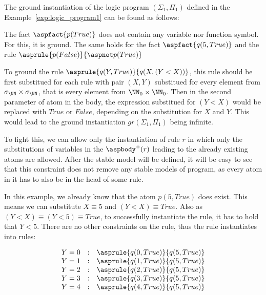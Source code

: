 \begin{example}\label{exp:grounding}
    The ground instantiation of the logic program $(\Sigma_1, \Pi_1)$ defined in the
    Example~\ref{exp:logic_program1} can be found as follows:

    The fact $\aspfact{p(True)}$ does not contain any variable nor function symbol.
    For this, it is ground. The same holds for the fact $\aspfact{q(5, True)}$
    and the rule $\asprule{p(False)}{\aspnot p(True)}$

    To ground the rule $\asprule{q(Y, True)}{q(X, (Y < X))}$,
    this rule should be first substitued for each rule with pair $(X, Y)$ substitued
    for every element from $\sigma_\NN \times \sigma_\NN$, that is every element
    from $\NN_0\times \NN_0$. Then in the second parameter of atom in the body,
    the expression substitued for $(Y < X)$ would be replaced with $True$ or $False$,
    depending on the substitution for $X$ and $Y$. This would lead to the ground
    instantiation $gr(\Sigma_1, \Pi_1)$ being infinite.

    To fight this, we can allow only the instantiation of rule $r$ in which
    only the substitutions of variables in the $\aspbody^+(r)$
    leading to the already existing atoms are allowed.
    After the stable model will be defined,
    it will be easy to see that this constraint does not remove any
    stable models of program, as every atom in it has to also be
    in the head of some rule.

    In this example, we already know that the atom $p(5, True)$ does exist.
    This means we can substitute $X\equiv 5$ and $(Y<X)\equiv True$.
    Also as $(Y<X)\equiv (Y < 5) \equiv True$, to successfully instantiate
    the rule, it has to hold that $Y < 5$. There are no other constraints
    on the rule, thus the rule instantiates into rules:

    \begin{equation*}
        \begin{matrix}
            Y=0 & : & \asprule{q(0, True)}{q(5, True)}\\
            Y=1 & : & \asprule{q(1, True)}{q(5, True)}\\
            Y=2 & : & \asprule{q(2, True)}{q(5, True)}\\
            Y=3 & : & \asprule{q(3, True)}{q(5, True)}\\
            Y=4 & : & \asprule{q(4, True)}{q(5, True)}\\
        \end{matrix}
    \end{equation*}


\end{example}
